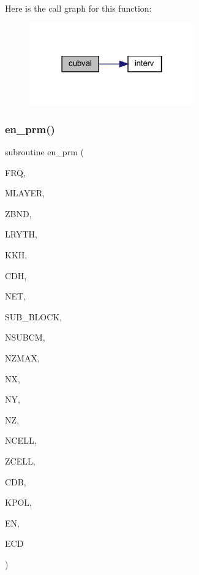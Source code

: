 Here is the call graph for this function\+:
\nopagebreak
\begin{figure}[H]
\begin{center}
\leavevmode
\includegraphics[width=202pt]{Marco_8f90_ab1863f6d59c2ac8a89880c1b6cc8cbe9_cgraph}
\end{center}
\end{figure}
\mbox{\label{Marco_8f90_aa315629893313c49aa9f1836084f80b6}} 
\subsubsection{\texorpdfstring{en\+\_\+prm()}{en\_prm()}}
{\footnotesize\ttfamily subroutine en\+\_\+prm (\begin{DoxyParamCaption}\item[{real}]{F\+RQ,  }\item[{integer}]{M\+L\+A\+Y\+ER,  }\item[{real, dimension(0\+:mlayer)}]{Z\+B\+ND,  }\item[{real, dimension(mlayer)}]{L\+R\+Y\+TH,  }\item[{complex, dimension(0\+:mlayer)}]{K\+KH,  }\item[{complex, dimension(0\+:mlayer)}]{C\+DH,  }\item[{integer}]{N\+ET,  }\item[{integer}]{S\+U\+B\+\_\+\+B\+L\+O\+CK,  }\item[{integer}]{N\+S\+U\+B\+CM,  }\item[{integer}]{N\+Z\+M\+AX,  }\item[{integer, dimension(sub\+\_\+block)}]{NX,  }\item[{integer, dimension(sub\+\_\+block)}]{NY,  }\item[{integer, dimension(sub\+\_\+block)}]{NZ,  }\item[{integer, dimension(sub\+\_\+block)}]{N\+C\+E\+LL,  }\item[{real, dimension(nzmax,sub\+\_\+block)}]{Z\+C\+E\+LL,  }\item[{complex, dimension(nsubcm,sub\+\_\+block)}]{C\+DB,  }\item[{integer}]{K\+P\+OL,  }\item[{complex, dimension(net)}]{EN,  }\item[{complex, dimension(net)}]{E\+CD }\end{DoxyParamCaption})}

